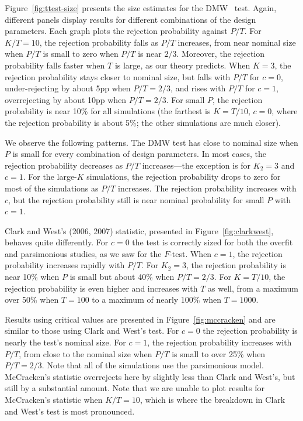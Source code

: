 \documentclass[12pt]{article}
\begin{document}
Figure~\ref{fig:ttest-size} presents the size estimates for the DMW
\oost\ test.  Again, different panels display results for different
combinations of the design parameters.  Each graph plots the rejection
probability against $P/T$.  For $K/T=10$, the rejection probability
falls as $P/T$ increases, from near nominal size when $P/T$ is small
to zero when $P/T$ is near $2/3$.  Moreover, the rejection probability
falls faster when $T$ is large, as our theory predicts.  When $K=3$,
the rejection probability stays closer to nominal size, but falls with
$P/T$ for $c=0$, under-rejecting by about 5pp when $P/T = 2/3$, and
rises with $P/T$ for $c=1$, overrejecting by about 10pp when
$P/T=2/3$.  For small $P$, the rejection probability is near 10\% for
all simulations (the farthest is $K=T/10$, $c=0$, where the rejection
probability is about 5\%; the other simulations are much closer).

We observe the following patterns.  The
DMW test has close to nominal size when $P$ is small for every
combination of design parameters.  In most cases, the rejection
probability decreases as $P/T$ increases---the exception is for $K_2 =
3$ and $c=1$.  For the large-$K$ simulations, the rejection
probability drops to zero for most of the simulations as $P/T$
increases.  The rejection probability increases with $c$, but the
rejection probability still is near nominal probability for small $P$
with $c=1$.

Clark and West's (2006, 2007) statistic, presented in
Figure~\ref{fig:clarkwest}, behaves quite differently.  For $c=0$ the
test is correctly sized for both the overfit and parsimonious studies,
as we saw for the $F$-test.  When $c=1$, the rejection probability
increases rapidly with $P/T$.  For $K_2=3$, the rejection probability
is near 10\% when $P$ is small but about 40\% when $P/T = 2/3$.  For
$K=T/10$, the rejection probability is even higher and increases with
$T$ as well, from a maximum over 50\% when $T=100$ to a maximum of
nearly 100\% when $T=1000$.

Results using  critical values are presented in
Figure~\ref{fig:mccracken} and are similar to those using Clark and
West's test.  For $c=0$ the rejection probability is nearly the test's
nominal size.  For $c=1$, the rejection probability increases with
$P/T$, from close to the nominal size when $P/T$ is small to over 25\%
when $P/T = 2/3$.  Note that all of the simulations use the
parsimonious model.  McCracken's statistic overrejects here by
slightly less than Clark and West's, but still by a substantial
amount. Note that we are unable to plot results for McCracken's
statistic when $K/T = 10$, which is where the breakdown in Clark and
West's test is most pronounced.
\end{document}
